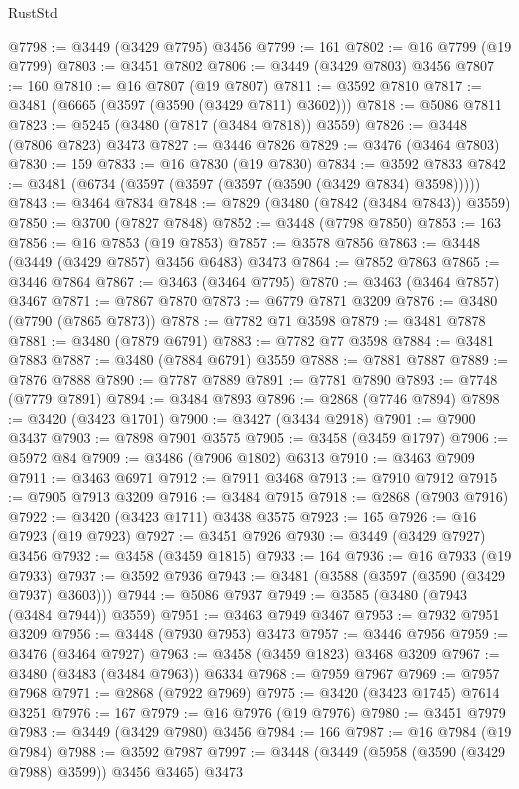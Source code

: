 \begin{lexlean}{RustStd}
\begin{coremodule}
{{{{{{{{{{{{{{{{{{{@7798 := @3449 (@3429 @7795) @3456
@7799 := 161
@7802 := @16 @7799 (@19 @7799)
@7803 := @3451 @7802
@7806 := @3449 (@3429 @7803) @3456
@7807 := 160
@7810 := @16 @7807 (@19 @7807)
@7811 := @3592 @7810
@7817 := @3481 (@6665 (@3597 (@3590 (@3429 @7811) @3602)))
@7818 := @5086 @7811
@7823 := @5245 (@3480 (@7817 (@3484 @7818)) @3559)
@7826 := @3448 (@7806 @7823) @3473
@7827 := @3446 @7826
@7829 := @3476 (@3464 @7803)
@7830 := 159
@7833 := @16 @7830 (@19 @7830)
@7834 := @3592 @7833
@7842 := @3481 (@6734 (@3597 (@3597 (@3597 (@3590 (@3429 @7834) @3598)))))
@7843 := @3464 @7834
@7848 := @7829 (@3480 (@7842 (@3484 @7843)) @3559)
@7850 := @3700 (@7827 @7848)
@7852 := @3448 (@7798 @7850)
@7853 := 163
@7856 := @16 @7853 (@19 @7853)
@7857 := @3578 @7856
@7863 := @3448 (@3449 (@3429 @7857) @3456 @6483) @3473
@7864 := @7852 @7863
@7865 := @3446 @7864
@7867 := @3463 (@3464 @7795)
@7870 := @3463 (@3464 @7857) @3467
@7871 := @7867 @7870
@7873 := @6779 @7871 @3209
@7876 := @3480 (@7790 (@7865 @7873))
@7878 := @7782 @71 @3598
@7879 := @3481 @7878
@7881 := @3480 (@7879 @6791)
@7883 := @7782 @77 @3598
@7884 := @3481 @7883
@7887 := @3480 (@7884 @6791) @3559
@7888 := @7881 @7887
@7889 := @7876 @7888
@7890 := @7787 @7889
@7891 := @7781 @7890
@7893 := @7748 (@7779 @7891)
@7894 := @3484 @7893
@7896 := @2868 (@7746 @7894)
@7898 := @3420 (@3423 @1701)
@7900 := @3427 (@3434 @2918)
@7901 := @7900 @3437
@7903 := @7898 @7901 @3575
@7905 := @3458 (@3459 @1797)
@7906 := @5972 @84
@7909 := @3486 (@7906 @1802) @6313
@7910 := @3463 @7909
@7911 := @3463 @6971
@7912 := @7911 @3468
@7913 := @7910 @7912
@7915 := @7905 @7913 @3209
@7916 := @3484 @7915
@7918 := @2868 (@7903 @7916)
@7922 := @3420 (@3423 @1711) @3438 @3575
@7923 := 165
@7926 := @16 @7923 (@19 @7923)
@7927 := @3451 @7926
@7930 := @3449 (@3429 @7927) @3456
@7932 := @3458 (@3459 @1815)
@7933 := 164
@7936 := @16 @7933 (@19 @7933)
@7937 := @3592 @7936
@7943 := @3481 (@3588 (@3597 (@3590 (@3429 @7937) @3603)))
@7944 := @5086 @7937
@7949 := @3585 (@3480 (@7943 (@3484 @7944)) @3559)
@7951 := @3463 @7949 @3467
@7953 := @7932 @7951 @3209
@7956 := @3448 (@7930 @7953) @3473
@7957 := @3446 @7956
@7959 := @3476 (@3464 @7927)
@7963 := @3458 (@3459 @1823) @3468 @3209
@7967 := @3480 (@3483 (@3484 @7963)) @6334
@7968 := @7959 @7967
@7969 := @7957 @7968
@7971 := @2868 (@7922 @7969)
@7975 := @3420 (@3423 @1745) @7614 @3251
@7976 := 167
@7979 := @16 @7976 (@19 @7976)
@7980 := @3451 @7979
@7983 := @3449 (@3429 @7980) @3456
@7984 := 166
@7987 := @16 @7984 (@19 @7984)
@7988 := @3592 @7987
@7997 := @3448 (@3449 (@5958 (@3590 (@3429 @7988) @3599)) @3456 @3465) @3473
}}}}}}}}}}}}}}}}}}}
\end{coremodule}
\end{lexlean}
